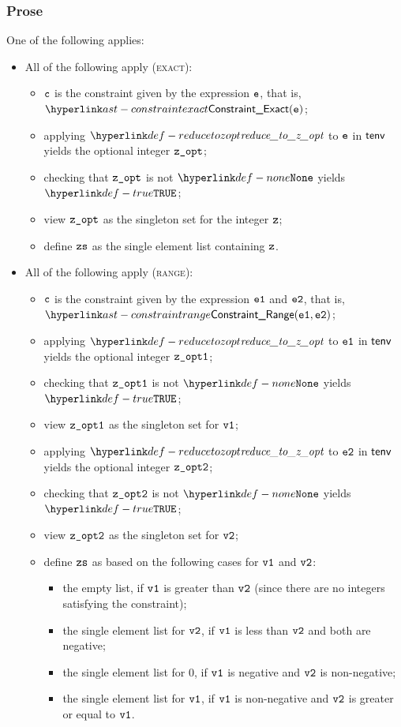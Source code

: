 \subsubsection{Prose}
One of the following applies:
\begin{itemize}
    \item All of the following apply (\textsc{exact}):
    \begin{itemize}
        \item $\texttt{c}$ is the constraint given by the expression $\texttt{e}$, that is, $\ConstraintExact(\ve)$;
        \item applying $\reducetozopt$ to $\texttt{e}$ in $\textsf{tenv}$ yields the optional integer $\texttt{z\_opt}$;
        \item checking that $\texttt{z\_opt}$ is not $\None$ yields $\True$\ProseTerminateAs{\BaseValueNonStatic};
        \item view $\texttt{z\_opt}$ as the singleton set for the integer $\texttt{z}$;
        \item define $\texttt{zs}$ as the single element list containing $\texttt{z}$.
    \end{itemize}

    \item All of the following apply (\textsc{range}):
    \begin{itemize}
        \item $\texttt{c}$ is the constraint given by the expression $\texttt{e1}$ and $\texttt{e2}$, that is, \\
                $\ConstraintRange(\veone, \vetwo)$;
        \item applying $\reducetozopt$ to $\texttt{e1}$ in $\textsf{tenv}$ yields the optional integer $\texttt{z\_opt1}$;
        \item checking that $\texttt{z\_opt1}$ is not $\None$ yields $\True$\ProseTerminateAs{\BaseValueNonStatic};
        \item view $\texttt{z\_opt1}$ as the singleton set for $\texttt{v1}$;
        \item applying $\reducetozopt$ to $\texttt{e2}$ in $\textsf{tenv}$ yields the optional integer $\texttt{z\_opt2}$;
        \item checking that $\texttt{z\_opt2}$ is not $\None$ yields $\True$\ProseTerminateAs{\BaseValueNonStatic};
        \item view $\texttt{z\_opt2}$ as the singleton set for $\texttt{v2}$;
        \item define $\texttt{zs}$ as based on the following cases for $\texttt{v1}$ and $\texttt{v2}$:
        \begin{itemize}
            \item the empty list, if $\texttt{v1}$ is greater than $\texttt{v2}$ (since there are no integers satisfying the constraint);
            \item the single element list for $\texttt{v2}$, if $\texttt{v1}$ is less than $\texttt{v2}$ and both are negative;
            \item the single element list for $0$, if $\texttt{v1}$ is negative and $\texttt{v2}$ is non-negative;
            \item the single element list for $\texttt{v1}$, if $\texttt{v1}$ is non-negative and $\texttt{v2}$ is greater or equal to $\texttt{v1}$.
        \end{itemize}
    \end{itemize}
\end{itemize}

